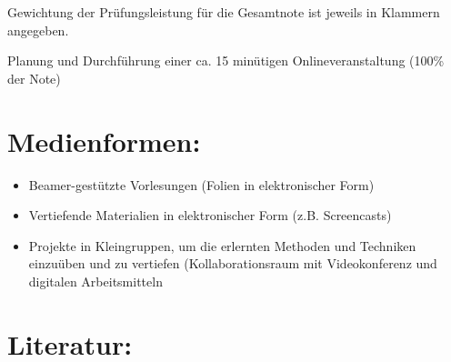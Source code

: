 Gewichtung der Prüfungsleistung für die Gesamtnote ist jeweils in
Klammern angegeben.

Planung und Durchführung einer ca. 15 minütigen Onlineveranstaltung
(100\% der Note)

\section*{Medienformen:\label{/mi-2017/modulbeschreibungen-master/MA_SC_WPF_CSCL}}\label{medienformenpathlabelmi-2017modulbeschreibungen-mastermaux5fscux5fwpfux5fcscl}

\begin{itemize}
\tightlist
\item
  Beamer-gestützte Vorlesungen (Folien in elektronischer Form)
\item
  Vertiefende Materialien in elektronischer Form (z.B. Screencasts)
\item
  Projekte in Kleingruppen, um die erlernten Methoden und Techniken
  einzuüben und zu vertiefen (Kollaborationsraum mit Videokonferenz und
  digitalen Arbeitsmitteln
\end{itemize}

\section*{Literatur:\label{/mi-2017/modulbeschreibungen-master/MA_SC_WPF_CSCL}}\label{literaturpathlabelmi-2017modulbeschreibungen-mastermaux5fscux5fwpfux5fcscl}

